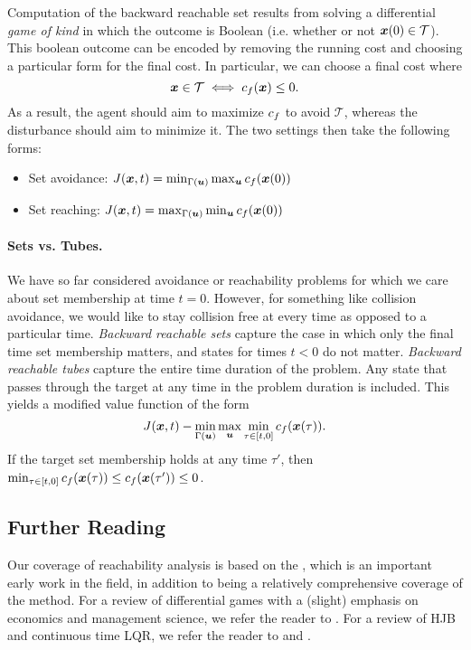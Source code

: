 Computation of the backward reachable set results from solving a differential \textit{game of kind} in which the outcome is Boolean (i.e. whether or not $\bm{x}(0) \in \mathcal{T}$). This boolean outcome can be encoded by removing the running cost and choosing a particular form for the final cost. In particular, we can choose a final cost where
\begin{equation}
    \bm{x} \in \mathcal{T} \iff c_f(\bm{x}) \leq 0.
\end{equation}
As a result, the agent should aim to maximize $c_f$ to avoid $\mathcal{T}$, whereas the disturbance should aim to minimize it. The two settings then take the following forms:
\begin{itemize}
    \item Set avoidance: $J(\bm{x},t) = \min_{\Gamma(\bm{u})} \max_{\bm{u}} c_f(\bm{x}(0))$
    \item Set reaching: $J(\bm{x},t) = \max_{\Gamma(\bm{u})} \min_{\bm{u}} c_f(\bm{x}(0))$
\end{itemize}

\paragraph{Sets vs. Tubes.} We have so far considered avoidance or reachability problems for which we care about set membership at time $t=0$. However, for something like collision avoidance, we would like to stay collision free at every time as opposed to a particular time. \textit{Backward reachable sets} capture the case in which only the final time set membership matters, and states for times $t<0$ do not matter. \textit{Backward reachable tubes} capture the entire time duration of the problem. Any state that passes through the target at any time in the problem duration is included. This yields a modified value function of the form
\begin{equation}
    J(\bm{x},t) - \min_{\Gamma(\bm{u})} \max_{\bm{u}} \min_{\tau \in [t,0]} c_f(\bm{x}(\tau)).
\end{equation}
If the target set membership holds at any time $\tau'$, then $\min_{\tau\in[t,0]} c_f(\bm{x}(\tau)) \leq c_f(\bm{x}(\tau')) \leq 0$.

\subsection{Further Reading}

Our coverage of reachability analysis is based on the \cite{mitchell2005time}, which is an important early work in the field, in addition to being a relatively comprehensive coverage of the method. For a review of differential games with a (slight) emphasis on economics and management science, we refer the reader to \cite{bressan2010noncooperative}. For a review of HJB and continuous time LQR, we refer the reader to \cite{bertsekas1995dynamic} and \cite{kirk2012optimal}.


